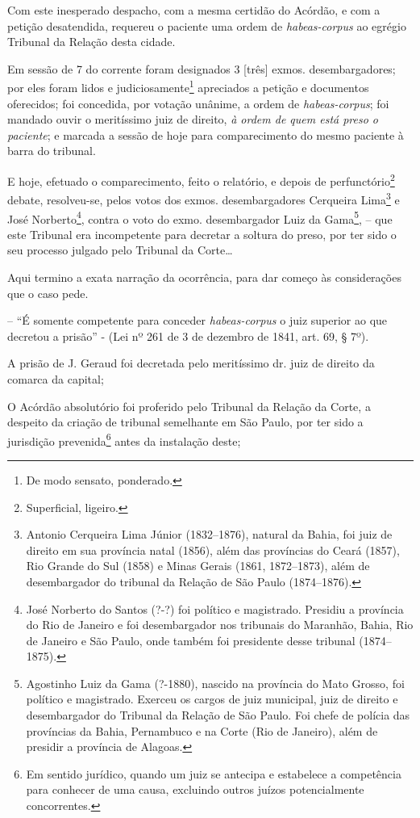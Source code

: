 Com este inesperado despacho, com a mesma certidão do Acórdão, e com a
petição desatendida, requereu o paciente uma ordem de
\emph{habeas-corpus} ao egrégio Tribunal da Relação desta cidade.

Em sessão de 7 do corrente foram designados 3 {[}três{]} exmos.
desembargadores; por eles foram lidos e judiciosamente\footnote{ De
  modo sensato, ponderado.} apreciados a petição e documentos
oferecidos; foi concedida, por votação unânime, a ordem de
\emph{habeas-corpus}; foi mandado ouvir o meritíssimo juiz de direito,
\emph{à ordem de quem está preso o paciente}; e marcada a sessão de hoje
para comparecimento do mesmo paciente à barra do tribunal.

E hoje, efetuado o comparecimento, feito o relatório, e depois de
perfunctório\footnote{ Superficial, ligeiro.} debate, resolveu-se,
pelos votos dos exmos. desembargadores Cerqueira Lima\footnote{ Antonio
  Cerqueira Lima Júnior (1832--1876), natural da Bahia, foi juiz de
  direito em sua província natal (1856), além das províncias do Ceará
  (1857), Rio Grande do Sul (1858) e Minas Gerais (1861, 1872--1873),
  além de desembargador do tribunal da Relação de São Paulo (1874--1876).}
e José Norberto\footnote{ José Norberto do Santos (?-?) foi político e
  magistrado. Presidiu a província do Rio de Janeiro e foi desembargador
  nos tribunais do Maranhão, Bahia, Rio de Janeiro e São Paulo, onde
  também foi presidente desse tribunal (1874--1875).}, contra o voto do
exmo. desembargador Luiz da Gama\footnote{ Agostinho Luiz da Gama
  (?-1880), nascido na província do Mato Grosso, foi político e
  magistrado. Exerceu os cargos de juiz municipal, juiz de direito e
  desembargador do Tribunal da Relação de São Paulo. Foi chefe de
  polícia das províncias da Bahia, Pernambuco e na Corte (Rio de
  Janeiro), além de presidir a província de Alagoas.}, -- que este
Tribunal era incompetente para decretar a soltura do preso, por ter sido
o seu processo julgado pelo Tribunal da Corte\ldots{}

Aqui termino a exata narração da ocorrência, para dar começo às
considerações que o caso pede.

-- ``É somente competente para conceder \emph{habeas-corpus} o juiz
superior ao que decretou a prisão'' - (Lei nº 261 de 3 de dezembro de
1841, art. 69, § 7º).

A prisão de J. Geraud foi decretada pelo meritíssimo dr. juiz de direito
da comarca da capital;

O Acórdão absolutório foi proferido pelo Tribunal da Relação da Corte, a
despeito da criação de tribunal semelhante em São Paulo, por ter sido a
jurisdição prevenida\footnote{ Em sentido jurídico, quando um juiz se
  antecipa e estabelece a competência para conhecer de uma causa,
  excluindo outros juízos potencialmente concorrentes.} antes da
instalação deste;

